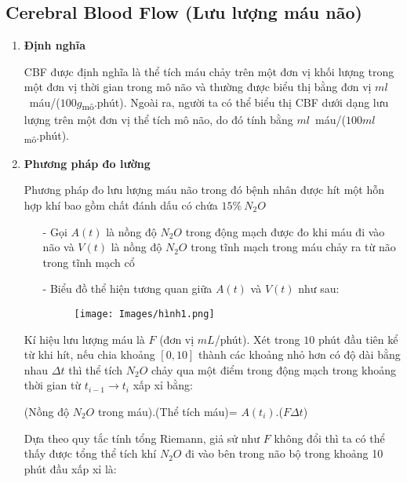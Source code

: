 \documentclass[12pt,a4paper]{article}
\begin{document}
\subsection{Cerebral Blood Flow (Lưu lượng máu não)}
\begin{enumerate}[a/]
	\item \textbf{Định nghĩa}
	      \begin{flushleft}
		      CBF được định nghĩa là thể tích máu chảy trên một đơn vị khối lượng trong
		      một đơn vị thời gian trong mô não và thường được biểu thị bằng đơn vị $ml$\ máu/($100g$\textsubscript{mô}.phút).
		      Ngoài ra, người ta có thể biểu thị CBF dưới dạng lưu lượng trên một đơn vị thể tích mô não,
		      do đó tính bằng $ml$\ máu/($100ml$\textsubscript{mô}.phút).
	      \end{flushleft}
	\item \textbf{Phương pháp đo lường}
	      \begin{flushleft}
		      Phương pháp đo lưu lượng máu não trong đó bệnh nhân được
		      hít một hỗn hợp khí bao gồm chất đánh dấu có chứa $15\%\ N_2O$
		      \begin{itemize}
			      \item[-] 	Gọi $A(t)$ là nồng độ $N_2O$ trong động mạch được đo khi máu đi vào não và $V(t)$ là nồng độ $N_2O$ trong tĩnh mạch trong máu chảy ra từ não trong tĩnh mạch cổ
			      \item[-] 	Biểu đồ thể hiện tương quan giữa $A(t)$ và $V(t)$ như sau:
	 \begin{figure} [ht]
             \centering
             \texttt{[image: Images/hình1.png]}
             \caption{}
             \label{fig:enter-label}
         \end{figure}
		      \end{itemize}
		      Kí hiệu lưu lượng máu là $F$ (đơn vị $mL$/phút). Xét trong $10$ phút đầu tiên
		      kể từ khi hít, nếu chia khoảng $\left[0,10\right]$ thành các khoảng nhỏ hơn có độ dài bằng nhau $\Delta t$ thì
		      thể tích $N_2O$ chảy qua một điểm trong động mạch trong khoảng thời gian từ $t_{i-1} \to t_i$ xấp xỉ bằng:
	      \end{flushleft}
	      \begin{center}
		      (Nồng độ $N_2O$ trong máu).(Thể tích máu)= $A(t_i)$.($F \Delta t$)
	      \end{center}
	      \begin{flushleft}
		      Dựa theo quy tắc tính tổng Riemann, giả sử như $F$ không đổi thì ta có thể thấy được tổng thể tích khí $N_2O$ đi vào bên trong não bộ trong khoảng 10 phút đầu xấp xỉ là:

\end{flushleft}
\end{enumerate}
\end{document}
